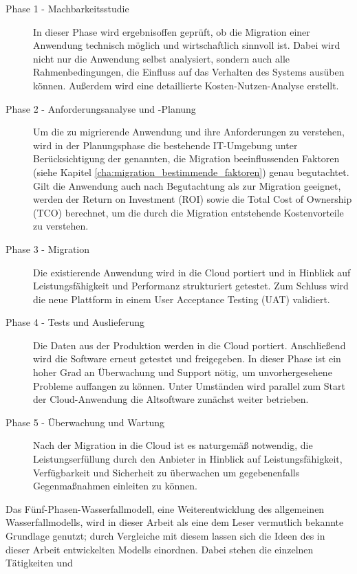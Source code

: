 \begin{description}
	\item[Phase 1 - Machbarkeitsstudie] In dieser Phase wird ergebnisoffen
geprüft, ob die Migration einer Anwendung technisch möglich und wirtschaftlich sinnvoll ist. 
Dabei wird nicht nur die Anwendung selbst analysiert, sondern
auch alle Rahmenbedingungen, die Einfluss auf das Verhalten des Systems ausüben
können. Außerdem wird eine detaillierte Kosten-Nutzen-Analyse erstellt.

	\item[Phase 2 - Anforderungsanalyse und -Planung] Um die zu migrierende
Anwendung und ihre Anforderungen zu verstehen, wird in der Planungsphase die
bestehende IT-Umgebung unter Berücksichtigung der genannten, die Migration
beeinflussenden Faktoren (siehe  Kapitel
\ref{cha:migration_bestimmende_faktoren})
genau begutachtet. Gilt die Anwendung auch nach Begutachtung als zur Migration
geeignet, werden der Return on Investment (ROI) sowie die Total Cost of
Ownership (TCO) berechnet, um die durch die Migration entstehende
Kostenvorteile
zu verstehen.

	\item[Phase 3 - Migration] Die existierende Anwendung wird in die Cloud
portiert und in Hinblick auf Leistungsfähigkeit und Performanz strukturiert
getestet. Zum Schluss wird die neue Plattform in einem User Acceptance Testing
(UAT) validiert.

	\item[Phase 4 - Tests und Auslieferung] Die Daten aus der Produktion
werden in die Cloud portiert. Anschließend wird die Software erneut getestet
und freigegeben. In dieser Phase ist ein hoher Grad an Überwachung und Support
nötig, um unvorhergesehene Probleme auffangen zu können. Unter Umständen wird
parallel zum Start der Cloud-Anwendung die Altsoftware zunächst weiter
betrieben.

	\item[Phase 5 - Überwachung und Wartung] Nach der Migration in die
Cloud ist es naturgemäß notwendig, die Leistungserfüllung durch den Anbieter in
Hinblick auf Leistungsfähigkeit, Verfügbarkeit und Sicherheit zu überwachen um
gegebenenfalls Gegenmaßnahmen einleiten zu können.
\end{description}
Das Fünf-Phasen-Wasserfallmodell, eine Weiterentwicklung des allgemeinen 
Wasserfallmodells, wird in dieser Arbeit als eine dem Leser vermutlich bekannte 
Grundlage genutzt; durch Vergleiche mit diesem lassen sich die Ideen des in dieser Arbeit 
entwickelten Modells einordnen. Dabei stehen die einzelnen Tätigkeiten und 
